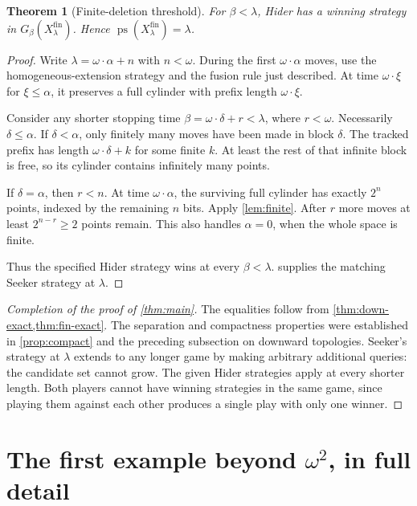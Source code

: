 \documentclass[11pt,a4paper]{article}
\newtheorem{theorem}{Theorem}[section]
\theoremstyle{definition}
\theoremstyle{remark}
\newcommand{\ps}{\operatorname{ps}}
\newcommand{\fin}{\mathrm{fin}}
\begin{document}
\begin{theorem}[Finite-deletion threshold]\label{thm:fin-exact}
For $\beta<\lambda$, Hider has a winning strategy in
$G_\beta(X_\lambda^\fin)$. Hence $\ps(X_\lambda^\fin)=\lambda$.
\end{theorem}
\begin{proof}
Write $\lambda=\omega\cdot\alpha+n$ with $n<\omega$. During the first
$\omega\cdot\alpha$ moves, use the homogeneous-extension strategy and the
fusion rule just described. At time $\omega\cdot\xi$ for $\xi\leq\alpha$, it
preserves a full cylinder with prefix length $\omega\cdot\xi$.

Consider any shorter stopping time
$\beta=\omega\cdot\delta+r<\lambda$, where $r<\omega$. Necessarily
$\delta\leq\alpha$. If $\delta<\alpha$, only finitely many moves have been
made in block $\delta$. The tracked prefix has length
$\omega\cdot\delta+k$ for some finite $k$. At least the rest of that infinite
block is free, so its cylinder contains infinitely many points.

If $\delta=\alpha$, then $r<n$. At time $\omega\cdot\alpha$, the surviving
full cylinder has exactly $2^n$ points, indexed by the remaining $n$ bits.
Apply \cref{lem:finite}. After $r$ more moves at least $2^{n-r}\geq2$ points
remain. This also handles $\alpha=0$, when the whole space is finite.

Thus the specified Hider strategy wins at every $\beta<\lambda$.
 supplies the matching Seeker strategy at $\lambda$.
\end{proof}

\begin{proof}[Completion of the proof of \cref{thm:main}]
The equalities follow from \cref{thm:down-exact,thm:fin-exact}. The separation and
compactness properties were established in \cref{prop:compact} and the preceding
subsection on downward topologies. Seeker's strategy at $\lambda$ extends to any
longer game by making arbitrary additional queries: the candidate set cannot
grow. The given Hider strategies apply at every shorter length. Both players
cannot have winning strategies in the same game, since playing them against each
other produces a single play with only one winner.
\end{proof}

\section{The first example beyond \texorpdfstring{$\omega^2$}{omega squared}, in full detail}
\end{document}
